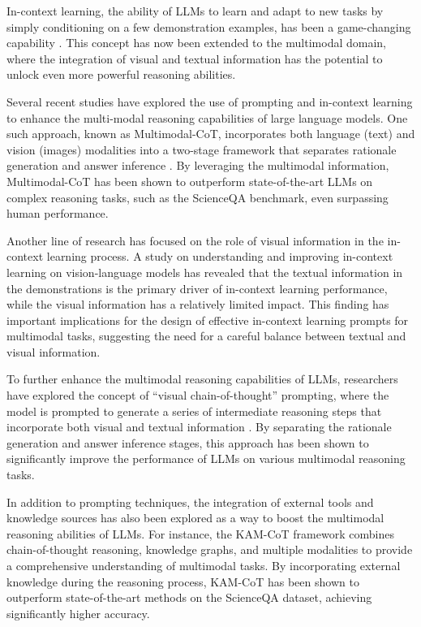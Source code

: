 \documentclass[11pt]{article}
\begin{document}
In-context learning, the ability of LLMs to learn and adapt to new tasks by simply conditioning on a few demonstration examples, has been a game-changing capability \cite{ref92,ref93}. This concept has now been extended to the multimodal domain, where the integration of visual and textual information has the potential to unlock even more powerful reasoning abilities.

Several recent studies have explored the use of prompting and in-context learning to enhance the multi-modal reasoning capabilities of large language models. One such approach, known as Multimodal-CoT, incorporates both language (text) and vision (images) modalities into a two-stage framework that separates rationale generation and answer inference \cite{ref94}. By leveraging the multimodal information, Multimodal-CoT has been shown to outperform state-of-the-art LLMs on complex reasoning tasks, such as the ScienceQA benchmark, even surpassing human performance.

Another line of research has focused on the role of visual information in the in-context learning process. A study on understanding and improving in-context learning on vision-language models \cite{ref95} has revealed that the textual information in the demonstrations is the primary driver of in-context learning performance, while the visual information has a relatively limited impact. This finding has important implications for the design of effective in-context learning prompts for multimodal tasks, suggesting the need for a careful balance between textual and visual information.

To further enhance the multimodal reasoning capabilities of LLMs, researchers have explored the concept of ``visual chain-of-thought'' prompting, where the model is prompted to generate a series of intermediate reasoning steps that incorporate both visual and textual information \cite{ref94}. By separating the rationale generation and answer inference stages, this approach has been shown to significantly improve the performance of LLMs on various multimodal reasoning tasks.

In addition to prompting techniques, the integration of external tools and knowledge sources has also been explored as a way to boost the multimodal reasoning abilities of LLMs. For instance, the KAM-CoT framework \cite{ref96} combines chain-of-thought reasoning, knowledge graphs, and multiple modalities to provide a comprehensive understanding of multimodal tasks. By incorporating external knowledge during the reasoning process, KAM-CoT has been shown to outperform state-of-the-art methods on the ScienceQA dataset, achieving significantly higher accuracy.
\end{document}
